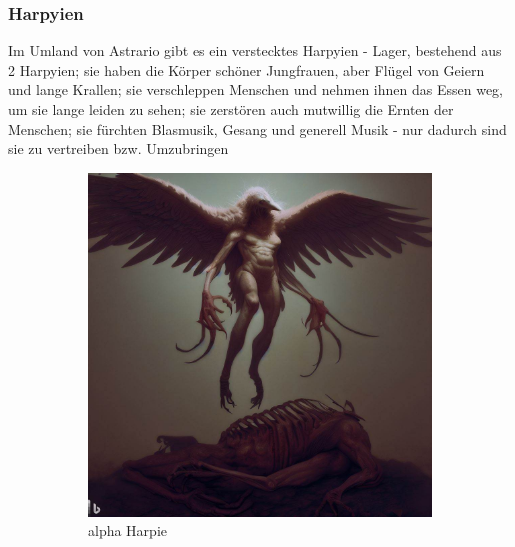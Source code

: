 \documentclass[11pt, twoside]{article}
\begin{document}
\subsubsection{Harpyien\label{harpie}}
\label{sec:orgb185d0b}
Im Umland von Astrario gibt es ein verstecktes Harpyien - Lager, bestehend aus 2 Harpyien; sie haben die Körper schöner Jungfrauen, aber Flügel von Geiern und lange Krallen; sie verschleppen Menschen und nehmen ihnen das Essen weg, um sie lange leiden zu sehen; sie zerstören auch mutwillig die Ernten der Menschen; sie fürchten Blasmusik, Gesang und generell Musik - nur dadurch sind sie zu vertreiben bzw. Umzubringen
\begin{figure}[H]
\centering
\caption{Harpyien}
\label{fig:harpie}
  \begin{subfigure}{0.3\textwidth}
    \centering
    \includegraphics[width=0.99\linewidth]{harpie1.jpeg}
    \caption{alpha Harpie}
  \end{subfigure}%
  \begin{subfigure}{0.3\textwidth}
    \centering

\end{subfigure}
\end{figure}
\end{document}
